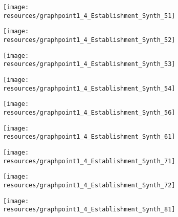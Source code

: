 \documentclass[12pt]{article}
\begin{document}
\begin{figure}[H]
	\centering
	\begin{subfigure}[b]{0.4\textwidth}
	    \texttt{[image: resources/graphpoint1\_4\_Establishment\_Synth\_51]}
	\end{subfigure}
	\begin{subfigure}[b]{0.4\textwidth}
		  \texttt{[image: resources/graphpoint1\_4\_Establishment\_Synth\_52]}
	\end{subfigure}
\end{figure}

\begin{figure}[H]
	\centering
	\begin{subfigure}[b]{0.4\textwidth}
	    \texttt{[image: resources/graphpoint1\_4\_Establishment\_Synth\_53]}
	\end{subfigure}
	\begin{subfigure}[b]{0.4\textwidth}
		  \texttt{[image: resources/graphpoint1\_4\_Establishment\_Synth\_54]}
	\end{subfigure}
\end{figure}

\begin{figure}[H]
	\centering
	\begin{subfigure}[b]{0.4\textwidth}
	    \texttt{[image: resources/graphpoint1\_4\_Establishment\_Synth\_56]}
	\end{subfigure}
	\begin{subfigure}[b]{0.4\textwidth}
		  \texttt{[image: resources/graphpoint1\_4\_Establishment\_Synth\_61]}
	\end{subfigure}
\end{figure}

\begin{figure}[H]
	\centering
	\begin{subfigure}[b]{0.4\textwidth}
	    \texttt{[image: resources/graphpoint1\_4\_Establishment\_Synth\_71]}
	\end{subfigure}
	\begin{subfigure}[b]{0.4\textwidth}
		  \texttt{[image: resources/graphpoint1\_4\_Establishment\_Synth\_72]}
	\end{subfigure}
\end{figure}

\begin{figure}[H]
	\centering
	\begin{subfigure}[b]{0.4\textwidth}
	    \texttt{[image: resources/graphpoint1\_4\_Establishment\_Synth\_81]}
	\end{subfigure}
\end{figure}
\end{document}
